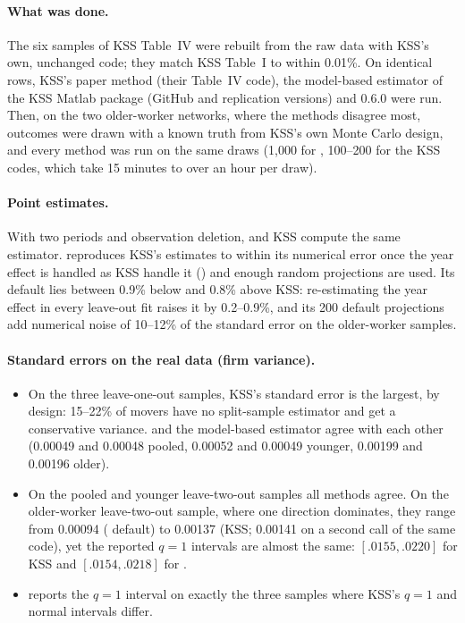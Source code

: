 \paragraph{What was done.} The six samples of KSS Table~IV were rebuilt from the raw data with KSS's own,
unchanged code; they match KSS Table~I to within 0.01\%. On identical rows, KSS's paper method (their
Table~IV code), the model-based estimator of the KSS Matlab package (GitHub and replication versions) and
\fevc{} 0.6.0 were run. Then, on the two older-worker networks, where the methods disagree most, outcomes were
drawn with a known truth from KSS's own Monte Carlo design, and every method was run on the same draws (1{,}000
for \fevc, 100--200 for the KSS codes, which take 15 minutes to over an hour per draw).

\paragraph{Point estimates.} With two periods and observation deletion, \fevc{} and KSS compute the same
estimator. \fevc{} reproduces KSS's estimates to within its numerical error once the year effect is handled as
KSS handle it () and enough random projections are used. Its default lies between
0.9\% below and 0.8\% above KSS: re-estimating the year effect in every leave-out fit raises it by 0.2--0.9\%,
and its 200 default projections add numerical noise of 10--12\% of the standard error on the older-worker
samples.

\paragraph{Standard errors on the real data (firm variance).}
\begin{itemize}
\item On the three leave-one-out samples, KSS's standard error is the largest, by design: 15--22\% of movers have
no split-sample estimator and get a conservative variance. \fevc{} and the model-based estimator agree with each
other (0.00049 and 0.00048 pooled, 0.00052 and 0.00049 younger, 0.00199 and 0.00196 older).
\item On the pooled and younger leave-two-out samples all methods agree. On the older-worker leave-two-out
sample, where one direction dominates, they range from 0.00094 (\fevc{} default) to 0.00137 (KSS; 0.00141 on a
second call of the same code), yet the
reported $q=1$ intervals are almost the same: $[.0155,.0220]$ for KSS and $[.0154,.0218]$ for \fevc.
\item \fevc{} reports the $q=1$ interval on exactly the three samples where KSS's $q=1$ and normal intervals
differ.
\end{itemize}

